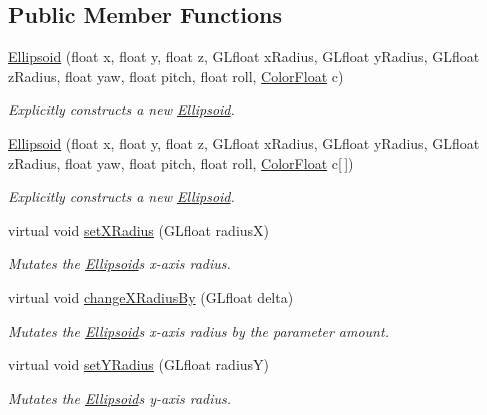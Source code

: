 \subsection*{Public Member Functions}
\begin{DoxyCompactItemize}
\item 
\hyperlink{classtsgl_1_1_ellipsoid_afd749d93e94a1d0310fb64e01d348cec}{Ellipsoid} (float x, float y, float z, G\+Lfloat x\+Radius, G\+Lfloat y\+Radius, G\+Lfloat z\+Radius, float yaw, float pitch, float roll, \hyperlink{structtsgl_1_1_color_float}{Color\+Float} c)
\begin{DoxyCompactList}\small\item\em Explicitly constructs a new \hyperlink{classtsgl_1_1_ellipsoid}{Ellipsoid}. \end{DoxyCompactList}\item 
\hyperlink{classtsgl_1_1_ellipsoid_a7e1a2eaf27ee32aeaf6415cb6b4eb149}{Ellipsoid} (float x, float y, float z, G\+Lfloat x\+Radius, G\+Lfloat y\+Radius, G\+Lfloat z\+Radius, float yaw, float pitch, float roll, \hyperlink{structtsgl_1_1_color_float}{Color\+Float} c\mbox{[}$\,$\mbox{]})
\begin{DoxyCompactList}\small\item\em Explicitly constructs a new \hyperlink{classtsgl_1_1_ellipsoid}{Ellipsoid}. \end{DoxyCompactList}\item 
virtual void \hyperlink{classtsgl_1_1_ellipsoid_a5ddfa2710dfff0e34186a9719f058fb7}{set\+X\+Radius} (G\+Lfloat radiusX)
\begin{DoxyCompactList}\small\item\em Mutates the \hyperlink{classtsgl_1_1_ellipsoid}{Ellipsoid}\textquotesingle{}s x-\/axis radius. \end{DoxyCompactList}\item 
virtual void \hyperlink{classtsgl_1_1_ellipsoid_ab0db918041ca4638236b007dade3cff0}{change\+X\+Radius\+By} (G\+Lfloat delta)
\begin{DoxyCompactList}\small\item\em Mutates the \hyperlink{classtsgl_1_1_ellipsoid}{Ellipsoid}\textquotesingle{}s x-\/axis radius by the parameter amount. \end{DoxyCompactList}\item 
virtual void \hyperlink{classtsgl_1_1_ellipsoid_a6a47161df73d22188aae92016c3058ca}{set\+Y\+Radius} (G\+Lfloat radiusY)
\begin{DoxyCompactList}\small\item\em Mutates the \hyperlink{classtsgl_1_1_ellipsoid}{Ellipsoid}\textquotesingle{}s y-\/axis radius. \end{DoxyCompactList}\item 

\end{DoxyCompactItemize}
